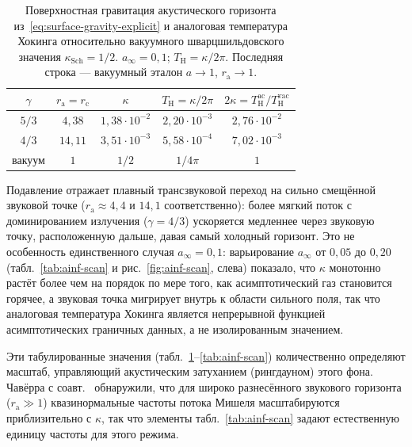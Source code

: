 \documentclass[12pt,a4paper,preprint]{elsarticle}
\begin{document}
            \begin{table}[htb]
                \centering
                \caption{Поверхностная гравитация акустического горизонта из~\eqref{eq:surface-gravity-explicit} и аналоговая температура Хокинга относительно вакуумного шварцшильдовского значения $\kappa_{\mathrm{Sch}}=1/2$. $a_{\infty}=0{,}1$; $T_{\mathrm{H}}=\kappa/2\pi$. Последняя строка --- вакуумный эталон $a\to 1$, $r_{\mathrm{a}}\to 1$.}
                \label{tab:surface-gravity}
                {\small
                \begin{tabular}{ccccc}
                    \toprule
                    $\gamma$ & $r_{\mathrm{a}}=r_{\mathrm{c}}$ & $\kappa$ & $T_{\mathrm{H}}=\kappa/2\pi$ & $2\kappa=T^{\mathrm{ac}}_{\mathrm{H}}/T^{\mathrm{vac}}_{\mathrm{H}}$ \\
                    \midrule
                    $5/3$    & $4{,}38$  & $1{,}38\cdot 10^{-2}$ & $2{,}20\cdot 10^{-3}$ & $2{,}76\cdot 10^{-2}$ \\
                    $4/3$    & $14{,}11$ & $3{,}51\cdot 10^{-3}$ & $5{,}58\cdot 10^{-4}$ & $7{,}02\cdot 10^{-3}$ \\
                    \midrule
                    вакуум     & $1$     & $1/2$               & $1/4\pi$            & $1$ \\
                    \bottomrule
                \end{tabular}
                }
            \end{table}

            Подавление отражает плавный трансзвуковой переход на сильно смещённой звуковой точке ($r_{\mathrm{a}}\approx 4{,}4$ и $14{,}1$ соответственно): более мягкий поток с доминированием излучения ($\gamma=4/3$) ускоряется медленнее через звуковую точку, расположенную дальше, давая самый холодный горизонт. Это не особенность единственного случая $a_{\infty}=0{,}1$: варьирование $a_{\infty}$ от $0{,}05$ до $0{,}20$ (табл.~\ref{tab:ainf-scan} и рис.~\ref{fig:ainf-scan}, слева) показало, что $\kappa$ монотонно растёт более чем на порядок по мере того, как асимптотический газ становится горячее, а звуковая точка мигрирует внутрь к области сильного поля, так что аналоговая температура Хокинга является непрерывной функцией асимптотических граничных данных, а не изолированным значением.

            Эти табулированные значения (табл.~\ref{tab:surface-gravity}--\ref{tab:ainf-scan}) количественно определяют масштаб, управляющий акустическим затуханием (рингдауном) этого фона. Чавёрра с соавт.~\cite{ChaverraE_MoralesMD_SarbachO_QuasinormalAcousticOscillationsInTheMichelFlow_2015} обнаружили, что для широко разнесённого звукового горизонта ($r_{\mathrm{a}}\gg 1$) квазинормальные частоты потока Мишеля масштабируются приблизительно с $\kappa$, так что элементы табл.~\ref{tab:ainf-scan} задают естественную единицу частоты для этого режима.
\end{document}
